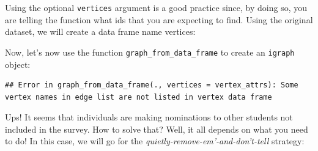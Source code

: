 \documentclass[]{book}
\newenvironment{Shaded}{\begin{snugshade}}{\end{snugshade}}
\newcommand{\CommentTok}[1]{\textcolor[rgb]{0.56,0.35,0.01}{\textit{#1}}}
\newcommand{\DataTypeTok}[1]{\textcolor[rgb]{0.13,0.29,0.53}{#1}}
\newcommand{\KeywordTok}[1]{\textcolor[rgb]{0.13,0.29,0.53}{\textbf{#1}}}
\newcommand{\NormalTok}[1]{#1}
\newcommand{\OperatorTok}[1]{\textcolor[rgb]{0.81,0.36,0.00}{\textbf{#1}}}
\newcommand{\StringTok}[1]{\textcolor[rgb]{0.31,0.60,0.02}{#1}}
\begin{document}
Using the optional \texttt{vertices} argument is a good practice since, by doing so, you are telling the function what ids that you are expecting to find. Using the original dataset, we will create a data frame name vertices:

\begin{Shaded}
\end{Shaded}

Now, let's now use the function \texttt{graph\_from\_data\_frame} to create an \texttt{igraph} object:

\begin{Shaded}
\end{Shaded}

\begin{verbatim}
## Error in graph_from_data_frame(., vertices = vertex_attrs): Some vertex names in edge list are not listed in vertex data frame
\end{verbatim}

Ups! It seems that individuals are making nominations to other students not included in the survey. How to solve that? Well, it all depends on what you need to do! In this case, we will go for the \emph{quietly-remove-em'-and-don't-tell} strategy:

\begin{Shaded}
\end{Shaded}
\end{document}
